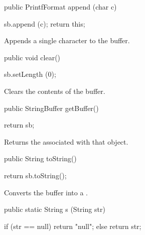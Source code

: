 \begin{code}

   public PrintfFormat append (char c)\begin{hide} {
      sb.append (c);
      return this;
   }\end{hide}
\end{code}
\begin{tabb}   Appends a single character to the buffer.
\end{tabb}
\begin{htmlonly}
\end{htmlonly}
\begin{code}

   public void clear()\begin{hide} {
      sb.setLength (0);
   }\end{hide}
\end{code}
\begin{tabb}   Clears the contents of the buffer.
\end{tabb}
\begin{code}

   public StringBuffer getBuffer()\begin{hide} {
      return sb;
   }\end{hide}
\end{code}
\begin{tabb}   Returns the  associated with that object.
\end{tabb}
\begin{htmlonly}
\end{htmlonly}
\begin{code}

   public String toString()\begin{hide} {
      return sb.toString();
   }\end{hide}
\end{code}
\begin{tabb}   Converts the buffer into a .
\end{tabb}
\begin{htmlonly}
\end{htmlonly}
\begin{code}

   public static String s (String str)\begin{hide} {
      if (str == null)
         return "null";
      else
         return str;
   }\end{hide}
\end{code}
